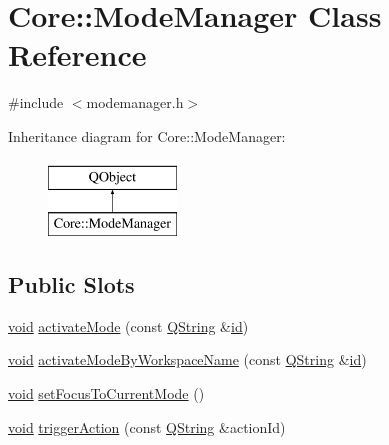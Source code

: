 \hypertarget{class_core_1_1_mode_manager}{\section{Core\-:\-:Mode\-Manager Class Reference}
\label{class_core_1_1_mode_manager}
}


{\ttfamily \#include $<$modemanager.\-h$>$}

Inheritance diagram for Core\-:\-:Mode\-Manager\-:\begin{figure}[H]
\begin{center}
\leavevmode
\includegraphics[height=2.000000cm]{class_core_1_1_mode_manager}
\end{center}
\end{figure}
\subsection*{Public Slots}
\begin{DoxyCompactItemize}
\item 
\hyperlink{group___u_a_v_objects_plugin_ga444cf2ff3f0ecbe028adce838d373f5c}{void} \hyperlink{group___core_plugin_ga9f75e14a1a348f3f46c62b4575dbca9e}{activate\-Mode} (const \hyperlink{group___u_a_v_objects_plugin_gab9d252f49c333c94a72f97ce3105a32d}{Q\-String} \&\hyperlink{glext_8h_a58c2a664503e14ffb8f21012aabff3e9}{id})
\item 
\hyperlink{group___u_a_v_objects_plugin_ga444cf2ff3f0ecbe028adce838d373f5c}{void} \hyperlink{group___core_plugin_gadd4b3b24c51d0993e61aab8ee9e76f48}{activate\-Mode\-By\-Workspace\-Name} (const \hyperlink{group___u_a_v_objects_plugin_gab9d252f49c333c94a72f97ce3105a32d}{Q\-String} \&\hyperlink{glext_8h_a58c2a664503e14ffb8f21012aabff3e9}{id})
\item 
\hyperlink{group___u_a_v_objects_plugin_ga444cf2ff3f0ecbe028adce838d373f5c}{void} \hyperlink{group___core_plugin_gab1fd02bc6554c6df4acfad271551230d}{set\-Focus\-To\-Current\-Mode} ()
\item 
\hyperlink{group___u_a_v_objects_plugin_ga444cf2ff3f0ecbe028adce838d373f5c}{void} \hyperlink{group___core_plugin_gad031a62ca8a27a4a5fb24c7bb77fbeb5}{trigger\-Action} (const \hyperlink{group___u_a_v_objects_plugin_gab9d252f49c333c94a72f97ce3105a32d}{Q\-String} \&action\-Id)
\end{DoxyCompactItemize}
